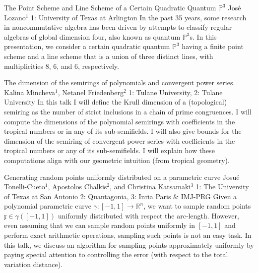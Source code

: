 \vspace{1.5ex}
\abs
{The Point Scheme and Line Scheme of a Certain Quadratic Quantum $\mathbb{P}^3$}%
{Jos\'{e} Lozano$^{1}$}
{1: University of Texas at Arlington}
{In the past 35 years, some research in noncommutative algebra has been driven by attempts to classify regular algebras of global dimension four, also known as quantum $\mathbb{P}^{3}$s. In this presentation, we consider a certain quadratic quantum $\mathbb{P}^{3}$ having a finite point scheme and a line scheme that is a union of three distinct lines, with multiplicities 8, 6, and 6, respectively.}


\vspace{1.5ex}
\abs
{The dimension of the semirings of polynomials and convergent power series.}
{Kalina Mincheva$^1$, Netanel Friedenberg$^2$}
{1: Tulane University, 2: Tulane University}
{In this talk I will define the Krull dimension of a (topological) semiring as the number of strict inclusions in a chain of prime congruences. I will compute the dimensions of the polynomial semirings with coefficients in the tropical numbers or in any of its sub-semifields. I will also give bounds for the dimension of the semiring of convergent power series with coefficients in the tropical numbers or any of its sub-semifields. I will explain how these computations align with our geometric intuition (from tropical geometry).}


\vspace{1.5ex}
\abs
{Generating random points uniformly distributed on a parametric curve}
{Josué Tonelli-Cueto$^{1}$, Apostolos Chalkis$^{2}$, and Christina Katsamaki$^{3}$}
{1: The University of Texas at San Antonio 2: Quantagonia, 3: Inria Paris \& IMJ-PRG}
{Given a polynomial parametric curve $\gamma:[-1,1]\rightarrow \mathbb{R}^n$, we want to sample random points $\mathfrak{x}\in\gamma([-1,1])$ uniformly distributed with respect the arc-length. However, even assuming that we can sample random points uniformly in $[-1,1]$ and perform exact arithmetic operations, sampling such points is not an easy task. In this talk, we discuss an algorithm for sampling points approximately uniformly by paying special attention to controlling the error (with respect to the total variation distance).}


